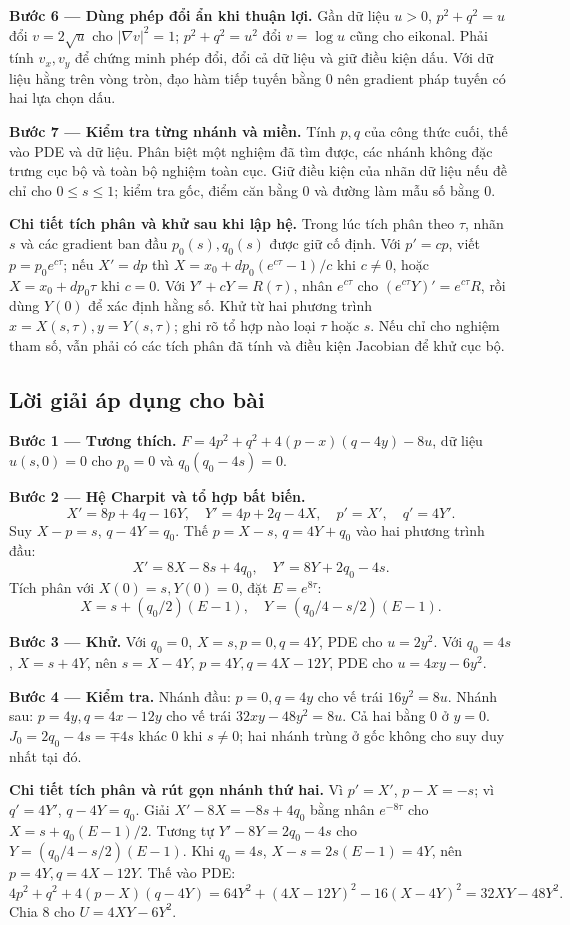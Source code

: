 \documentclass[10pt,a4paper]{article}
\begin{document}
\textbf{Bước 6 — Dùng phép đổi ẩn khi thuận lợi.} Gần dữ liệu $u>0$, $p^2+q^2=u$ đổi $v=2\sqrt u$ cho $|\nabla v|^2=1$; $p^2+q^2=u^2$ đổi $v=\log u$ cũng cho eikonal. Phải tính $v_x,v_y$ để chứng minh phép đổi, đổi cả dữ liệu và giữ điều kiện dấu. Với dữ liệu hằng trên vòng tròn, đạo hàm tiếp tuyến bằng 0 nên gradient pháp tuyến có hai lựa chọn dấu.

\textbf{Bước 7 — Kiểm tra từng nhánh và miền.} Tính $p,q$ của công thức cuối, thế vào PDE và dữ liệu. Phân biệt một nghiệm đã tìm được, các nhánh không đặc trưng cục bộ và toàn bộ nghiệm toàn cục. Giữ điều kiện của nhãn dữ liệu nếu đề chỉ cho $0\le s\le1$; kiểm tra gốc, điểm căn bằng 0 và đường làm mẫu số bằng 0.

\textbf{Chi tiết tích phân và khử sau khi lập hệ.} Trong lúc tích phân theo $\tau$, nhãn $s$ và các gradient ban đầu $p_0(s),q_0(s)$ được giữ cố định. Với $p'=cp$, viết $p=p_0e^{c\tau}$; nếu $X'=dp$ thì $X=x_0+dp_0(e^{c\tau}-1)/c$ khi $c\ne0$, hoặc $X=x_0+dp_0\tau$ khi $c=0$. Với $Y'+cY=R(\tau)$, nhân $e^{c\tau}$ cho $(e^{c\tau}Y)'=e^{c\tau}R$, rồi dùng $Y(0)$ để xác định hằng số. Khử từ hai phương trình $x=X(s,\tau),y=Y(s,\tau)$; ghi rõ tổ hợp nào loại $\tau$ hoặc $s$. Nếu chỉ cho nghiệm tham số, vẫn phải có các tích phân đã tính và điều kiện Jacobian để khử cục bộ.
\subsection*{Lời giải áp dụng cho bài}
\textbf{Bước 1 — Tương thích.} $F=4p^2+q^2+4(p-x)(q-4y)-8u$, dữ liệu $u(s,0)=0$ cho $p_0=0$ và $q_0(q_0-4s)=0$.

\textbf{Bước 2 — Hệ Charpit và tổ hợp bất biến.}
\[X'=8p+4q-16Y,\quad Y'=4p+2q-4X,\quad p'=X',\quad q'=4Y'.\]
Suy $X-p=s$, $q-4Y=q_0$. Thế $p=X-s$, $q=4Y+q_0$ vào hai phương trình đầu:
\[X'=8X-8s+4q_0,\quad Y'=8Y+2q_0-4s.\]
Tích phân với $X(0)=s,Y(0)=0$, đặt $E=e^{8\tau}$:
\[X=s+(q_0/2)(E-1),\quad Y=(q_0/4-s/2)(E-1).\]

\textbf{Bước 3 — Khử.} Với $q_0=0$, $X=s,p=0,q=4Y$, PDE cho $u=2y^2$. Với $q_0=4s$, $X=s+4Y$, nên $s=X-4Y$, $p=4Y,q=4X-12Y$, PDE cho $u=4xy-6y^2$.

\textbf{Bước 4 — Kiểm tra.} Nhánh đầu: $p=0,q=4y$ cho vế trái $16y^2=8u$. Nhánh sau: $p=4y,q=4x-12y$ cho vế trái $32xy-48y^2=8u$. Cả hai bằng 0 ở $y=0$. $J_0=2q_0-4s=\mp4s$ khác 0 khi $s\ne0$; hai nhánh trùng ở gốc không cho suy duy nhất tại đó.

\textbf{Chi tiết tích phân và rút gọn nhánh thứ hai.} Vì $p'=X'$, $p-X=-s$; vì $q'=4Y'$, $q-4Y=q_0$. Giải $X'-8X=-8s+4q_0$ bằng nhân $e^{-8\tau}$ cho $X=s+q_0(E-1)/2$. Tương tự $Y'-8Y=2q_0-4s$ cho $Y=(q_0/4-s/2)(E-1)$. Khi $q_0=4s$, $X-s=2s(E-1)=4Y$, nên $p=4Y,q=4X-12Y$. Thế vào PDE:
\[4p^2+q^2+4(p-X)(q-4Y)
=64Y^2+(4X-12Y)^2-16(X-4Y)^2
=32XY-48Y^2.\]
Chia $8$ cho $U=4XY-6Y^2$.
\end{document}
